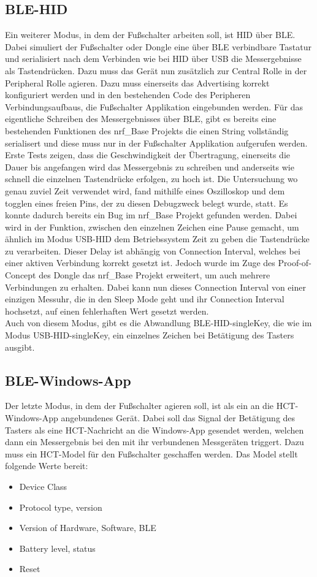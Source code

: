 \subsection{BLE-HID}
Ein weiterer Modus, in dem der Fußschalter arbeiten soll, ist HID über BLE. Dabei simuliert der Fußschalter oder Dongle eine über BLE verbindbare Tastatur und serialisiert nach dem Verbinden wie bei HID über USB die Messergebnisse als Tastendrücken. Dazu muss das Gerät nun zusätzlich zur Central Rolle in der Peripheral Rolle agieren. Dazu muss einerseits das Advertising korrekt konfiguriert werden und in den bestehenden Code des Peripheren Verbindungsaufbaus, die Fußschalter Applikation eingebunden werden. Für das eigentliche Schreiben des Messergebnisses über BLE, gibt es bereits eine bestehenden Funktionen des nrf\_Base Projekts die einen String vollständig serialisert und diese muss nur in der Fußschalter Applikation aufgerufen werden.\\
Erste Tests zeigen, dass die Geschwindigkeit der Übertragung, einerseits die Dauer bis angefangen wird das Messergebnis zu schreiben und anderseits wie schnell die einzelnen Tastendrücke erfolgen, zu hoch ist. Die Untersuchung wo genau zuviel Zeit verwendet wird, fand mithilfe eines Oszilloskop und dem togglen eines freien Pins, der zu diesen Debugzweck belegt wurde, statt. Es konnte dadurch bereits ein Bug im nrf\_Base Projekt gefunden werden. Dabei wird in der Funktion, zwischen den einzelnen Zeichen eine Pause gemacht, um ähnlich im Modus USB-HID dem Betriebssystem Zeit zu geben die Tastendrücke zu verarbeiten. Dieser Delay ist abhängig von Connection Interval, welches bei einer aktiven Verbindung korrekt gesetzt ist. Jedoch wurde im Zuge des Proof-of-Concept des Dongle das nrf\_Base Projekt erweitert, um auch mehrere Verbindungen zu erhalten. Dabei kann nun dieses Connection Interval von einer einzigen Messuhr, die in den Sleep Mode geht und ihr Connection Interval hochsetzt, auf einen fehlerhaften Wert gesetzt werden.\\
Auch von diesem Modus, gibt es die Abwandlung BLE-HID-singleKey, die wie im Modus USB-HID-singleKey, ein einzelnes Zeichen bei Betätigung des Tasters ausgibt.

\subsection{BLE-Windows-App}
Der letzte Modus, in dem der Fußschalter agieren soll, ist als ein an die HCT-Windows-App angebundenes Gerät. Dabei soll das Signal der Betätigung des Tasters als eine HCT-Nachricht an die Windows-App gesendet werden, welchen dann ein Messergebnis bei den mit ihr verbundenen Messgeräten triggert. Dazu muss ein HCT-Model für den Fußschalter geschaffen werden. Das Model stellt folgende Werte bereit:
\begin{itemize}
	\item Device Class
	\item Protocol type, version 
	\item Version of Hardware, Software, BLE
	\item Battery level, status
	\item Reset 
\end{itemize}

